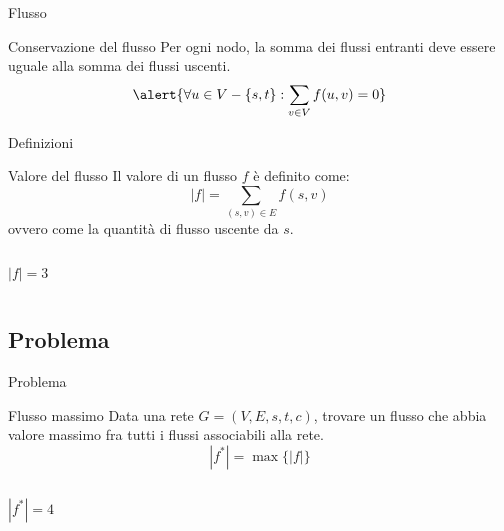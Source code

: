 \begin{frame}{Flusso}

\vspace{-9pt}
\begin{block}{Conservazione del flusso}
Per ogni nodo, la somma dei flussi entranti deve essere uguale alla somma dei flussi uscenti.
\[
\alert{\forall u \in V-\{s,t\}: \sum_{v \in V} f(u,v) = 0}
\]
\end{block}

\smallskip
\begin{center}
\end{center}

\end{frame}

\begin{frame}{Definizioni}

\vspace{-9pt}
\begin{block}{Valore del flusso}
Il \alert{valore di un flusso} $f$ è definito come:
\[
  |f| = \sum_{(s, v) \in E} f(s,v)
\]
ovvero come la quantità di flusso uscente da $s$.
\end{block}

\begin{columns}[T]
\[|f| = 3\]
\vspace{-12pt}
\end{columns}

\end{frame}

\subsection{Problema}

\begin{frame}{Problema}

\vspace{-9pt}
\begin{block}{Flusso massimo}
Data una rete $G=(V,E,s,t,c)$, trovare un flusso che abbia valore massimo fra 
tutti i flussi associabili alla rete.
\[
  |f^*| = \max \{ |f| \}
\]
\end{block}

\begin{columns}[T]
\[|f^*| = 4\]
\vspace{-12pt}
\end{columns}

\end{frame}

